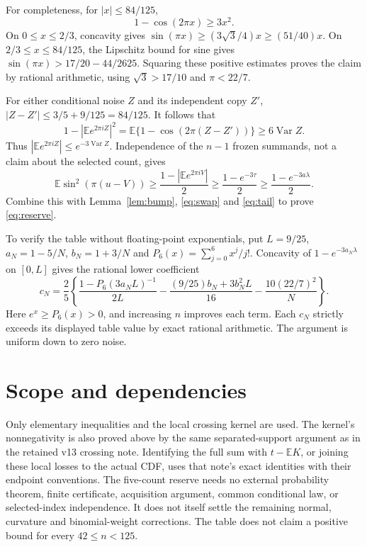 \documentclass[11pt]{article}
\newcommand{\E}{\mathbb E}\newcommand{\Pp}{\mathbb P}
\begin{document}
For completeness, for $|x|\le84/125$,
\[
1-\cos(2\pi x)\ge3x^2.
\]
On $0\le x\le2/3$, concavity gives
$\sin(\pi x)\ge(3\sqrt3/4)x\ge(51/40)x$.
On $2/3\le x\le84/125$, the Lipschitz bound for sine gives
$\sin(\pi x)>17/20-44/2625$.
Squaring these positive estimates proves the claim by rational
arithmetic, using $\sqrt3>17/10$ and $\pi<22/7$.

For either conditional noise $Z$ and its independent copy $Z'$,
$|Z-Z'|\le3/5+9/125=84/125$. It follows that
\[
1-|\E e^{2\pi iZ}|^2
=\E\{1-\cos(2\pi(Z-Z'))\}\ge6\operatorname{Var}Z.
\]
Thus $|\E e^{2\pi iZ}|\le e^{-3\operatorname{Var}Z}$. Independence
of the $n-1$ frozen summands, not a claim about the selected count, gives
\[
\E\sin^2(\pi(u-V))
\ge\frac{1-|\E e^{2\pi iV}|}{2}
\ge\frac{1-e^{-3\tau}}2
\ge\frac{1-e^{-3a\lambda}}2.
\]
Combine this with Lemma~\ref{lem:bump}, \eqref{eq:swap}
and \eqref{eq:tail} to prove \eqref{eq:reserve}.

To verify the table without floating-point exponentials, put $L=9/25$,
$a_N=1-5/N$, $b_N=1+3/N$ and
$P_6(x)=\sum_{j=0}^6x^j/j!$.
Concavity of $1-e^{-3a_N\lambda}$ on $[0,L]$ gives the rational lower
coefficient
\[
c_N=\frac25\left\{
\frac{1-P_6(3a_NL)^{-1}}{2L}
-\frac{(9/25)b_N+3b_N^2L}{16}
-\frac{10(22/7)^2}{N}\right\}.
\]
Here $e^x\ge P_6(x)>0$, and increasing $n$ improves each term.
Each $c_N$ strictly exceeds its displayed table value by exact rational
arithmetic. The argument is uniform down to zero noise.

\section*{Scope and dependencies}
Only elementary inequalities and the local crossing kernel are used.
The kernel's nonnegativity is also proved above by the same separated-support
argument as in the retained v13 crossing note. Identifying the full sum
with $t-\E K$, or joining these local losses to the actual CDF, uses that
note's exact identities with their endpoint conventions.
The five-count reserve needs no external probability theorem, finite
certificate, acquisition argument, common conditional law, or selected-index
independence. It does not itself settle the remaining normal, curvature and
binomial-weight corrections. The table does not claim a positive bound
for every $42\le n<125$.
\end{document}

